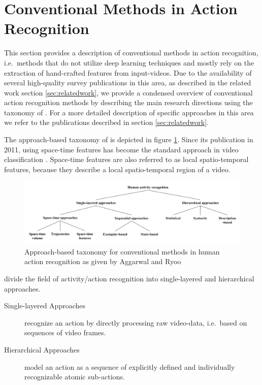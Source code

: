 \section{Conventional Methods in Action Recognition}
\label{chap:conventional}

This section provides a description of conventional methods in action recognition, i.e.\ methods that do not utilize deep learning techniques and mostly rely on the extraction of hand-crafted features from input-videos.
Due to the availability of several high-quality survey publications in this area, as described in the related work section \ref{sec:relatedwork}, we provide a condensed overview of conventional action recognition methods by describing the main research directions using the taxonomy of \textcite{aggarwal_human_2011}.
For a more detailed description of specific approaches in this area we refer to the publications described in section \ref{sec:relatedwork}.

The approach-based taxonomy of \textcite{aggarwal_human_2011} is depicted in figure \ref{fig:conventional_taxonomy}.
Since its publication in 2011, using space-time features has become the standard approach in video classification \cite{karpathy_large-scale_2014}.
Space-time features are also referred to as local spatio-temporal features, because they describe a local spatio-temporal region of a video.


\begin{figure}[H]
    \centering
    \includegraphics[width=\textwidth]{img_conventional/taxonomy_conventional_methods.png}
    \caption{Approach-based taxonomy for conventional methods in human action recognition as given by Aggarwal and Ryoo \cite{aggarwal_human_2011}}
    \label{fig:conventional_taxonomy}
\end{figure}

\textcite{aggarwal_human_2011} divide the field of activity/action recognition into single-layered and hierarchical approaches.
\begin{description}
    \item[Single-layered Approaches] recognize an action by directly processing raw video-data, i.e.\ based on sequences of video frames.
    \item[Hierarchical Approaches] model an action as a sequence of explicitly defined and individually recognizable atomic sub-actions.
\end{description}

